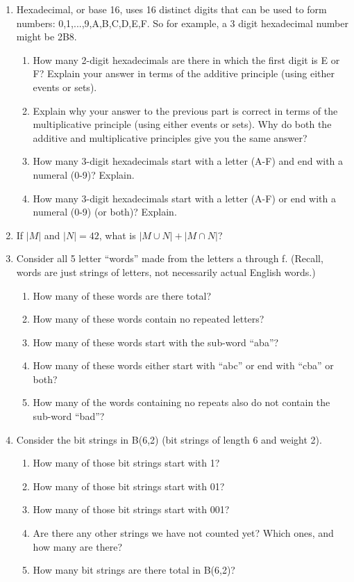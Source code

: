 \documentclass[11pt, letterpaper, includehead]{article}
\theoremstyle{plain}
\theoremstyle{mydefinition}
\theoremstyle{myproperty}
\begin{document}
\begin{enumerate}[label=\textbf{\arabic*}., leftmargin=*]
\item Hexadecimal, or base 16, uses 16 distinct digits that can be used to form numbers: {0,1,...,9,A,B,C,D,E,F}. So for example, a 3 digit hexadecimal number might be 2B8.
\begin{enumerate}[label=(\alph*)]
    \item How many 2-digit hexadecimals are there in which the first digit is E or F? Explain your answer in terms of the additive principle (using either events or sets).
    \item Explain why your answer to the previous part is correct in terms of the multiplicative principle (using either events or sets). Why do both the additive and multiplicative principles give you the same answer?
    \item How many 3-digit hexadecimals start with a letter (A-F) and end with a numeral (0-9)? Explain.
    \item How many 3-digit hexadecimals start with a letter (A-F) or end with a numeral (0-9) (or both)? Explain.
\end{enumerate}

\item If $|M|$ and $|N| = 42$, what is $|M \cup N| + |M \cap N|$?
\item Consider all 5 letter ``words'' made from the letters a through f. (Recall, words are just strings of letters, not necessarily actual English words.)
\begin{enumerate}[label=(\alph*)]
    \item How many of these words are there total?
    \item How many of these words contain no repeated letters?
    \item How many of these words start with the sub-word ``aba''?
    \item How many of these words either start with ``abc'' or end with ``cba'' or both?
    \item How many of the words containing no repeats also do not contain the sub-word ``bad''?
\end{enumerate}

\item Consider the bit strings in B(6,2) (bit strings of length 6 and weight 2).
\begin{enumerate}[label=(\alph*)]
    \item How many of those bit strings start with 1?
    \item How many of those bit strings start with 01?
    \item How many of those bit strings start with 001?
    \item Are there any other strings we have not counted yet? Which ones, and how many are there?
    \item How many bit strings are there total in B(6,2)?
\end{enumerate}
\end{enumerate}
\end{document}
